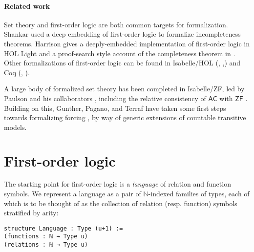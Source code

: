 \documentclass[sigplan,10pt,review, anonymous]{acmart}
\newcommand{\N}{\mathbb{N}}
\theoremstyle{definition}
\begin{document}
\paragraph{Related work} Set theory and first-order logic are both common targets for formalization. Shankar \cite{shankar1997metamathematics} used a deep embedding of first-order logic to formalize incompleteness theorems. Harrison gives a deeply-embedded implementation of first-order logic in HOL Light \cite{harrison1998formalizing} and a proof-search style account of the completeness theorem in \cite{harrison2009handbook}. Other formalizations of first-order logic can be found in Isabelle/HOL (\cite{Ridge2005AMV}, \cite{schlichtkrull2018formalization},\cite{FOL-Fitting-AFP}) and Coq (\cite{ilik2010constructive}, \cite{DBLP:conf/tphol/OConnor05}).

A large body of formalized set theory has been completed in Isabelle/ZF, led by Paulson and his collaborators \cite{paulson1996mechanizing, paulson1993set, paulson2002reflection}, including the relative consistency of \(\mathsf{AC}\) with $\mathsf{ZF}$ \cite{paulson2008relative}. Building on this, Gunther, Pagano, and Terraf have taken some first steps towards formalizing forcing \cite{gunther2018first, gunther2019mechanization}, by way of generic extensions of countable transitive models.



\section{First-order logic}
\label{sect:fol}

The starting point for first-order logic is a \emph{language} of relation and function symbols.
We represent a language as a pair of $\N$-indexed families of types, each of which is to be thought of as the collection of relation (resp. function) symbols stratified by arity:
\begin{lstlisting}
structure Language : Type (u+1) :=
(functions : ℕ → Type u)
(relations : ℕ → Type u)
\end{lstlisting}
\end{document}
